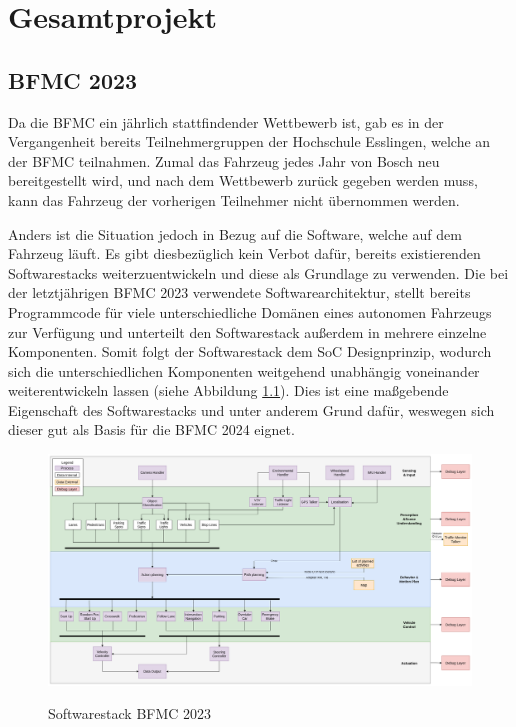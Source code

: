 \chapter{Gesamtprojekt}

\section{BFMC 2023}
Da die \gls{BFMC} ein jährlich stattfindender Wettbewerb ist, gab es in der Vergangenheit bereits Teilnehmergruppen der Hochschule Esslingen, welche an der \gls{BFMC} teilnahmen. Zumal das Fahrzeug jedes Jahr von Bosch neu bereitgestellt wird, und nach dem Wettbewerb zurück gegeben werden muss, kann das Fahrzeug der vorherigen Teilnehmer nicht übernommen werden. 

Anders ist die Situation jedoch in Bezug auf die Software, welche auf dem Fahrzeug läuft. Es gibt diesbezüglich kein Verbot dafür, bereits existierenden Softwarestacks weiterzuentwickeln und diese als Grundlage zu verwenden. Die bei der letztjährigen \gls{BFMC} 2023 verwendete Softwarearchitektur, stellt bereits Programmcode für viele unterschiedliche Domänen eines autonomen Fahrzeugs zur Verfügung und unterteilt den Softwarestack außerdem in mehrere einzelne Komponenten. Somit folgt der Softwarestack dem \gls{SoC} Designprinzip, wodurch sich die unterschiedlichen Komponenten weitgehend unabhängig voneinander weiterentwickeln lassen (siehe Abbildung \ref{fig:softwarestack2023}). Dies ist eine maßgebende Eigenschaft des Softwarestacks und unter anderem Grund dafür, weswegen sich dieser gut als Basis für die \gls{BFMC} 2024 eignet.
\begin{figure}[H]
    \centering
    \includegraphics[width=1\linewidth]{Pictures/Project_Architecture_4_DriverlES.png}
    \caption{Softwarestack BFMC 2023}
    \cite{softwarestackBFMC2023}
    \label{fig:softwarestack2023}
\end{figure}

